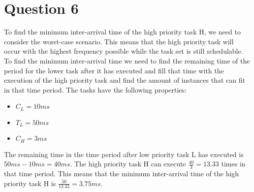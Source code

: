 \section{Question 6}

    To find the minimum inter-arrival time of the high priority task H, we need to consider the worst-case scenario. This means that the high priority task will occur with the highest frequency possible while the task set is still schedulable. To find the minimum inter-arrival time we need to find the remaining time of the period for the lower task after it has executed and fill that time with the execution of the high priority task and find the amount of instances that can fit in that time period. The tasks have the following properties:
    
    \begin{itemize}
        \item $C_L = 10ms$
        \item $T_L = 50ms$
        \item $C_H = 3ms$
    \end{itemize}

    The remaining time in the time period after low priority task L has executed is $50ms - 10ms =40ms$. The high priority task H can execute $\frac{40}{3} = 13.33$ times in that time period. This means that the minimum inter-arrival time of the high priority task H is $\frac{50}{13.33} = 3.75ms$.